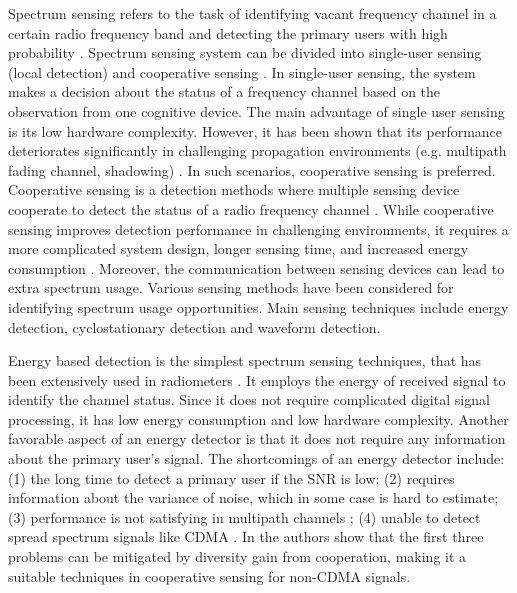 Spectrum sensing refers to the task of identifying vacant frequency channel in a certain radio frequency band and detecting the primary users with high probability \cite{umar2012spectrum}. 
Spectrum sensing system can be divided into single-user sensing (local detection) and cooperative sensing \cite{wang2011advances, akyildiz2011cooperative, ma2008soft, axell2010overview}. In single-user sensing, the system makes a decision about the status of a frequency channel based on the observation from one cognitive device. The main advantage of single user sensing is its low hardware complexity. However, it has been shown that its performance deteriorates significantly in challenging propagation environments (e.g. multipath fading channel, shadowing) \cite{akyildiz2011cooperative}. In such scenarios, cooperative sensing is preferred. Cooperative sensing is a detection methods where multiple sensing device cooperate to detect the status of a radio frequency channel \cite{ganesan2005cooperative, arslan2007cognitive}. While cooperative sensing improves detection performance in challenging environments, it requires a more complicated system design,  longer sensing time,  and increased energy consumption \cite{akyildiz2011cooperative}.  
Moreover, the communication between sensing devices can lead to extra spectrum usage. 
Various sensing methods have been considered for identifying spectrum usage opportunities. Main sensing techniques include  energy detection, cyclostationary detection and waveform detection. 

Energy based detection is the simplest spectrum sensing techniques, that has been extensively used in radiometers \cite{cabric2004implementation, poor1994introduction, urkowitz1967energy}. It employs the energy of received signal to identify the channel status. Since it does not require complicated digital signal processing, it has low energy consumption and low hardware complexity.  Another favorable aspect of an energy detector is that it does not require  any information about the primary user's signal.  
The shortcomings of an energy detector include: (1) the long time to detect a  primary user if the SNR is low; (2) requires information about the variance of noise, which in some case is hard to estimate; (3) performance is not satisfying in multipath channels \cite{akyildiz2011cooperative}; (4) unable to detect spread spectrum signals like CDMA \cite{urkowitz1967energy, akyildiz2011cooperative}. 
In \cite{akyildiz2011cooperative} the authors show that the first three problems can be mitigated by diversity gain from cooperation,  making it a suitable techniques in cooperative sensing for non-CDMA signals.  


